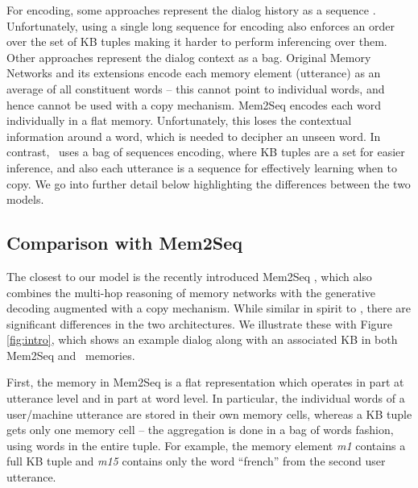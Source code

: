 For encoding, some approaches represent the dialog history as a sequence \cite{eric2017copy,ptr-unk}. Unfortunately, using a single long sequence for encoding also enforces an order over the set of KB tuples making it harder to perform inferencing over them. Other approaches represent the dialog context as a bag. Original Memory Networks \cite{BordesW16} and its extensions encode each memory element (utterance) as an average of all constituent words -- this cannot point to individual words, and hence cannot be used with a copy mechanism. Mem2Seq encodes each word individually in a flat memory. Unfortunately, this loses the contextual information around a word, which is needed to decipher an unseen word. In contrast, \sys\ uses a bag of sequences encoding, where KB tuples are a set for easier inference, and also each utterance is a sequence for effectively learning when to copy. We go into further detail below highlighting the differences between the two models.



\subsection{Comparison with Mem2Seq}
\label{sec:relatedmem2seq}
The closest to our model is the recently introduced Mem2Seq \cite{mem2seq}, which also combines the multi-hop reasoning of memory networks with the generative decoding augmented with a copy mechanism. While similar in spirit to \sys, there are significant differences in the two architectures. We illustrate these with Figure \ref{fig:intro}, which shows an example dialog along with an associated KB in both Mem2Seq and \sys\ memories. %

First, the memory in Mem2Seq is a flat representation which operates in part at utterance level and in part at word level. In particular, the individual words of a user/machine utterance are stored in their own memory cells, whereas a KB tuple gets only one memory cell -- the aggregation is done in a bag of words fashion, using words in the entire tuple.  For example, the memory element \textit{m1} contains a full KB tuple and \textit{m15} contains only the word ``french'' from the second user utterance.

